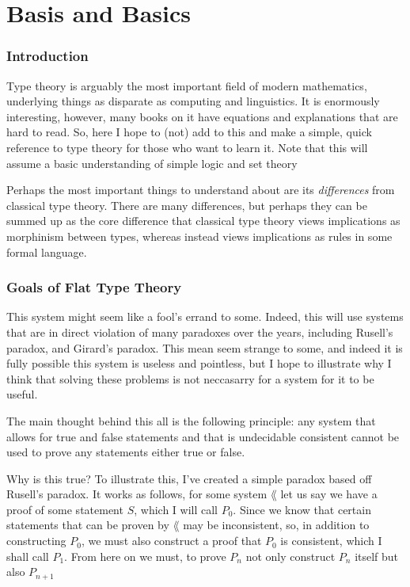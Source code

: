 \part{Basis and Basics}

\section{Introduction}
Type theory is arguably the most important field of modern mathematics, underlying things as disparate as computing and linguistics.
It is enormously interesting, however, many books on it have equations and explanations that are hard to read.
So, here I hope to (not) add to this and make a simple, quick reference to type theory for those who want to learn it.
Note that this will assume a basic understanding of simple logic and set theory

Perhaps the most important things to understand about \this are its \emph{differences} from classical type theory.
There are many differences, but perhaps they can be summed up as the core difference that classical type theory views implications as morphinism between types, whereas \this instead views implications as rules in some formal language.


\section{Goals of Flat Type Theory}
\label{paradox}
This system might seem like a fool's errand to some.
Indeed, this will use systems that are in direct violation of many paradoxes over the years, including Rusell's paradox, and Girard's paradox.
This mean seem strange to some, and indeed it is fully possible this system is useless and pointless, but I hope to illustrate why I think that solving these problems is not neccasarry for a system for it to be useful.

The main thought behind this all is the following principle: any system that allows for true and false statements and that is undecidable consistent cannot be used to prove any statements either true or false.

Why is this true?
To illustrate this, I've created a simple paradox based off Rusell's paradox.
It works as follows, for some system $\lang$ let us say we have a proof of some statement $S$, which I will call $P_0$.
Since we know that certain statements that can be proven by $\lang$ may be inconsistent, so, in addition to constructing $P_0$, we must also construct a proof that $P_0$ is consistent, which I shall call $P_1$.
From here on we must, to prove $P_n$ not only construct $P_n$ itself but also $P_{n+1}$

